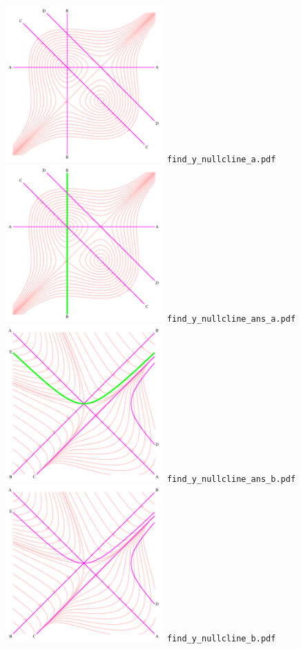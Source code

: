 \documentclass[a4paper]{amsart}
\begin{document}
\includegraphics[width=6cm]{find_y_nullcline_a.pdf}\verb+ find_y_nullcline_a.pdf+\\
\includegraphics[width=6cm]{find_y_nullcline_ans_a.pdf}\verb+ find_y_nullcline_ans_a.pdf+\\
\includegraphics[width=6cm]{find_y_nullcline_ans_b.pdf}\verb+ find_y_nullcline_ans_b.pdf+\\
\includegraphics[width=6cm]{find_y_nullcline_b.pdf}\verb+ find_y_nullcline_b.pdf+\\
\end{document}
